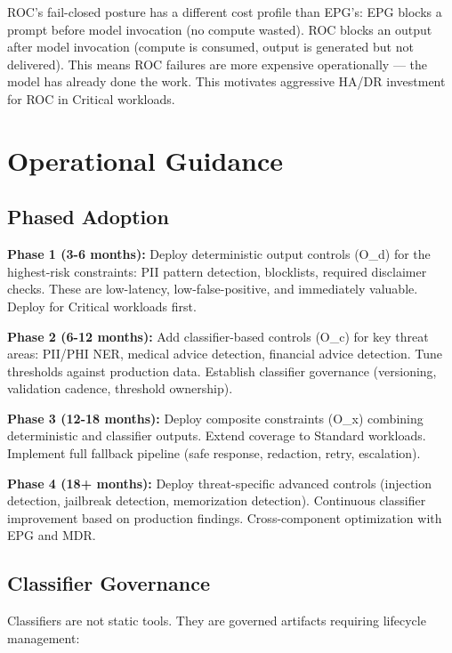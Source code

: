 ROC's fail-closed posture has a different cost profile than EPG's: EPG blocks a prompt before model invocation (no compute wasted). ROC blocks an output after model invocation (compute is consumed, output is generated but not delivered). This means ROC failures are more expensive operationally --- the model has already done the work. This motivates aggressive HA/DR investment for ROC in Critical workloads.



\section{Operational Guidance}
\label{sec:controls-8}


\subsection{Phased Adoption}


\textbf{Phase 1 (3-6 months):} Deploy deterministic output controls (O\_\allowbreak{}d) for the highest-risk constraints: PII pattern detection, blocklists, required disclaimer checks. These are low-latency, low-false-positive, and immediately valuable. Deploy for Critical workloads first.

\textbf{Phase 2 (6-12 months):} Add classifier-based controls (O\_\allowbreak{}c) for key threat areas: PII/PHI NER, medical advice detection, financial advice detection. Tune thresholds against production data. Establish classifier governance (versioning, validation cadence, threshold ownership).

\textbf{Phase 3 (12-18 months):} Deploy composite constraints (O\_\allowbreak{}x) combining deterministic and classifier outputs. Extend coverage to Standard workloads. Implement full fallback pipeline (safe response, redaction, retry, escalation).

\textbf{Phase 4 (18+ months):} Deploy threat-specific advanced controls (injection detection, jailbreak detection, memorization detection). Continuous classifier improvement based on production findings. Cross-component optimization with EPG and MDR.

\subsection{Classifier Governance}


Classifiers are not static tools. They are governed artifacts requiring lifecycle management:


